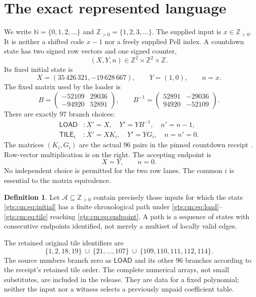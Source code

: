 \documentclass[11pt,letterpaper]{article}
\theoremstyle{definition}
\newtheorem{definition}[theorem]{Definition}
\theoremstyle{remark}
\newcommand{\Z}{\mathbb Z}
\newcommand{\N}{\mathbb N}
\newcommand{\Pos}{\Z_{>0}}
\newcommand{\LOAD}{\mathsf{LOAD}}
\newcommand{\TILE}{\mathsf{TILE}}
\begin{document}
\section{The exact represented language}
\label{gts:cm:sec:language}
We write $\N=\{0,1,2,\ldots\}$ and $\Pos=\{1,2,3,\ldots\}$. The supplied input is $x\in\Pos$. It is neither a shifted code $x-1$ nor a freely supplied Pell index. A countdown state has two signed row vectors and one signed counter,
\[
 (X,Y,n)\in\Z^2\times\Z^2\times\Z.
\]
Its fixed initial state is
\begin{equation}\label{gts:cm:eq:initial}
 X=(35\,426\,321,-19\,628\,667),\qquad Y=(1,0),\qquad n=x.
\end{equation}
The fixed matrix used by the loader is
\begin{equation}\label{gts:cm:eq:B}
 B=\begin{pmatrix}-52109&29036\\-94920&52891\end{pmatrix},\qquad
 B^{-1}=\begin{pmatrix}52891&-29036\\94920&-52109\end{pmatrix}.
\end{equation}
There are exactly 97 branch choices:
\begin{align}
 \LOAD &: X'=X,\quad Y'=YB^{-1},\quad n'=n-1,\label{gts:cm:eq:load}\\
 \TILE_i &: X'=XK_i,\quad Y'=YG_i,\quad n=n'=0.
 \label{gts:cm:eq:tile}
\end{align}
The matrices $(K_i,G_i)$ are the actual 96 pairs in the pinned countdown receipt \cite{cm-countdown}. Row-vector multiplication is on the right. The accepting endpoint is
\begin{equation}\label{gts:cm:eq:endpoint}
 X=Y,\qquad n=0.
\end{equation}
No independent choice is permitted for the two row lanes. The common $i$ is essential to the matrix equivalence.

\begin{definition}
Let $\mathcal A\subseteq\Pos$ contain precisely those inputs for which the state \eqref{gts:cm:eq:initial} has a finite chronological path under \eqref{gts:cm:eq:load}--\eqref{gts:cm:eq:tile} reaching \eqref{gts:cm:eq:endpoint}. A path is a sequence of states with consecutive endpoints identified, not merely a multiset of locally valid edges.
\end{definition}

The retained original tile identifiers are
\[
 \{1,2,18,19\}\ \cup\ \{21,\ldots,107\}\ \cup\ \{109,110,111,112,114\}.
\]
The source numbers branch zero as $\LOAD$ and its other 96 branches according to the receipt's retained tile order. The complete numerical arrays, not small substitutes, are included in the release. They are data for a fixed polynomial; neither the input nor a witness selects a previously unpaid coefficient table.
\end{document}
